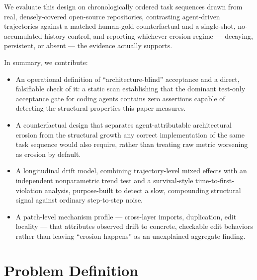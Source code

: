 \documentclass[11pt]{article}
\begin{document}
We evaluate this design on chronologically ordered task sequences drawn from real, densely-covered open-source repositories, contrasting agent-driven trajectories against a matched human-gold counterfactual and a single-shot, no-accumulated-history control, and reporting whichever erosion regime --- decaying, persistent, or absent --- the evidence actually supports.

In summary, we contribute:
\begin{itemize}[leftmargin=1.4em]
\item An operational definition of ``architecture-blind'' acceptance and a direct, falsifiable check of it: a static scan establishing that the dominant test-only acceptance gate for coding agents contains zero assertions capable of detecting the structural properties this paper measures.
\item A counterfactual design that separates agent-attributable architectural erosion from the structural growth any correct implementation of the same task sequence would also require, rather than treating raw metric worsening as erosion by default.
\item A longitudinal drift model, combining trajectory-level mixed effects with an independent nonparametric trend test and a survival-style time-to-first-violation analysis, purpose-built to detect a slow, compounding structural signal against ordinary step-to-step noise.
\item A patch-level mechanism profile --- cross-layer imports, duplication, edit locality --- that attributes observed drift to concrete, checkable edit behaviors rather than leaving ``erosion happens'' as an unexplained aggregate finding.
\end{itemize}

\section{Problem Definition}
\end{document}
